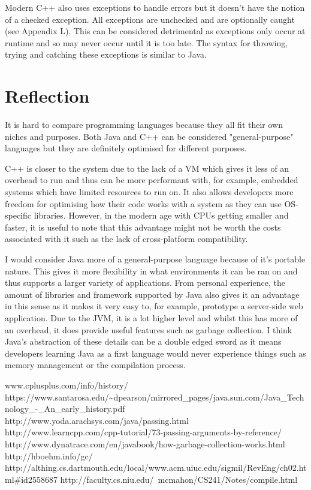 \documentclass[]{report}
\begin{document}
Modern C++ also uses exceptions to handle errors but it doesn't have the notion of a checked exception. All exceptions are unchecked and are optionally caught (see Appendix L). This can be considered detrimental as exceptions only occur at runtime and so may never occur until it is too late. The syntax for throwing, trying and catching these exceptions is similar to Java.\cite{ExceptionsC++}

\section{Reflection}

It is hard to compare programming languages because they all fit their own niches and purposes. Both Java and C++ can be considered "general-purpose" languages but they are definitely optimised for different purposes. 

C++ is closer to the system due to the lack of a VM which gives it less of an overhead to run and thus can be more performant with, for example, embedded systems which have limited resources to run on. It also allows developers more freedom for optimising how their code works with a system as they can use OS-specific libraries. However, in the modern age with CPUs getting smaller and faster, it is useful to note that this advantage might not be worth the costs associated with it such as the lack of cross-platform compatibility.

I would consider Java more of a general-purpose language because of it's portable nature. This gives it more flexibility in what environments it can be ran on and thus supports a larger variety of applications. From personal experience, the amount of libraries and framework supported by Java also gives it an advantage in this sense as it makes it very easy to, for example, prototype a server-side web application. Due to the JVM, it is a lot higher level and whilst this has more of an overhead, it does provide useful features such as garbage collection. I think Java's abstraction of these details can be a double edged sword as it means developers learning Java as a first language would never experience things such as memory management or the compilation process.

\begin{thebibliography}{20}
	www.cplusplus.com/info/history/
	https://www.santarosa.edu/\textasciitilde{}dpearson/mirrored\_pages/java.sun.com/Java\_Technology\_-\_An\_early\_history.pdf
	http://www.yoda.arachsys.com/java/passing.html
	http://www.learncpp.com/cpp-tutorial/73-passing-arguments-by-reference/
	http://www.dynatrace.com/en/javabook/how-garbage-collection-works.html
	http://hboehm.info/gc/
	http://althing.cs.dartmouth.edu/local/www.acm.uiuc.edu/sigmil/RevEng/ch02.html\#id2558687
	http://faculty.cs.niu.edu/~mcmahon/CS241/Notes/compile.html
\end{thebibliography}
\end{document}
